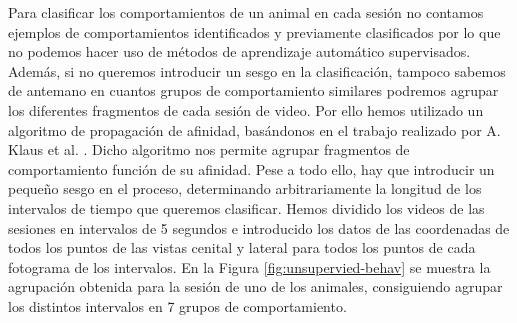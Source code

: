 Para clasificar los comportamientos de un animal en cada sesión no contamos ejemplos de comportamientos identificados y previamente clasificados por lo que no podemos hacer uso de métodos de aprendizaje automático supervisados. Además, si no queremos introducir un sesgo en la clasificación, tampoco sabemos de antemano en cuantos grupos de comportamiento similares podremos agrupar los diferentes fragmentos de cada sesión de video. Por ello hemos utilizado un algoritmo de propagación de afinidad, basándonos en el trabajo realizado por A. Klaus et al. \cite{neuron}. Dicho algoritmo nos permite agrupar fragmentos de comportamiento función de su afinidad. Pese a todo ello, hay que introducir un pequeño sesgo en el proceso, determinando arbitrariamente la longitud de los intervalos de tiempo que queremos clasificar. Hemos dividido los videos de las sesiones en intervalos de 5 segundos e introducido los datos de las coordenadas de todos los puntos de las vistas cenital y lateral para todos los puntos de cada fotograma de los intervalos. En la Figura \ref{fig:unsupervied-behav} se muestra la agrupación obtenida para la sesión de uno de los animales, consiguiendo agrupar los distintos intervalos en 7 grupos de comportamiento.

